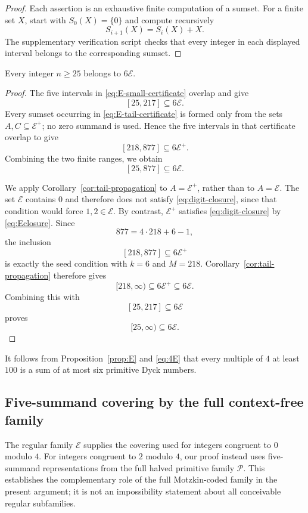 \documentclass{ws-ijfcs}
\newcommand{\Pset}{\mathcal P}
\begin{document}
\begin{proof}
Each assertion is an exhaustive finite computation of a sumset.  For a
finite set $X$, start with $S_0(X)=\{0\}$ and compute recursively
\[
 S_{i+1}(X)=S_i(X)+X.
\]
The supplementary verification script checks that every integer in each
displayed interval belongs to the corresponding sumset.
\end{proof}

\begin{proposition}\label{prop:E}
Every integer $n\geq25$ belongs to $6\mathcal E$.
\end{proposition}

\begin{proof}
The five intervals in \eqref{eq:E-small-certificate} overlap and give
\[
 [25,217]\subseteq6\mathcal E.
\]
Every sumset occurring in \eqref{eq:E-tail-certificate} is formed only
from the sets $A,C\subseteq\mathcal E^+$; no zero summand is used.
Hence the five intervals in that certificate overlap to give
\[
 [218,877]\subseteq6\mathcal E^+.
\]
Combining the two finite ranges, we obtain
\begin{equation}\label{eq:E-small-cover}
 [25,877]\subseteq6\mathcal E.
\end{equation}

We apply Corollary~\ref{cor:tail-propagation} to
$A=\mathcal E^+$, rather than to $A=\mathcal E$.  The set
$\mathcal E$ contains $0$ and therefore does not satisfy
\eqref{eq:digit-closure}, since that condition would force
$1,2\in\mathcal E$.  By contrast, $\mathcal E^+$ satisfies
\eqref{eq:digit-closure} by \eqref{eq:Eclosure}.  Since
\[
 877=4\cdot218+6-1,
\]
the inclusion
\[
 [218,877]\subseteq6\mathcal E^+
\]
is exactly the seed condition with $k=6$ and $M=218$.
Corollary~\ref{cor:tail-propagation} therefore gives
\[
 [218,\infty)\subseteq6\mathcal E^+\subseteq6\mathcal E.
\]
Combining this with
\[
 [25,217]\subseteq6\mathcal E
\]
proves
\[
 [25,\infty)\subseteq6\mathcal E.
\]
\end{proof}

It follows from Proposition~\ref{prop:E} and \eqref{eq:4E} that every
multiple of $4$ at least $100$ is a sum of at most six primitive Dyck
numbers.

\subsection{Five-summand covering by the full context-free family}

The regular family $\mathcal E$ supplies the covering used for integers
congruent to $0$ modulo $4$.  For integers congruent to $2$ modulo $4$,
our proof instead uses five-summand representations from the full halved
primitive family $\Pset$.  This establishes the complementary role of the
full Motzkin-coded family in the present argument; it is not an
impossibility statement about all conceivable regular subfamilies.
\end{document}
